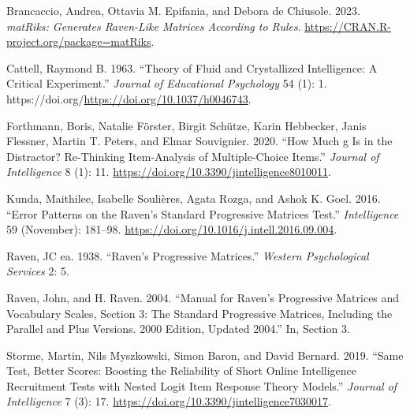 \label{refs}
\begin{CSLReferences}{1}{0}
Brancaccio, Andrea, Ottavia M. Epifania, and Debora de Chiusole. 2023. \emph{matRiks: Generates Raven-Like Matrices According to Rules}. \url{https://CRAN.R-project.org/package=matRiks}.

Cattell, Raymond B. 1963. {``Theory of Fluid and Crystallized Intelligence: A Critical Experiment.''} \emph{Journal of Educational Psychology} 54 (1): 1. https://doi.org/\url{https://doi.org/10.1037/h0046743}.

Forthmann, Boris, Natalie Förster, Birgit Schütze, Karin Hebbecker, Janis Flessner, Martin T. Peters, and Elmar Souvignier. 2020. {``How {Much} g {Is} in the {Distractor}? {Re}-{Thinking} {Item}-{Analysis} of {Multiple}-{Choice} {Items}.''} \emph{Journal of Intelligence} 8 (1): 11. \url{https://doi.org/10.3390/jintelligence8010011}.

Kunda, Maithilee, Isabelle Soulières, Agata Rozga, and Ashok K. Goel. 2016. {``Error Patterns on the {Raven}'s {Standard} {Progressive} {Matrices} {Test}.''} \emph{Intelligence} 59 (November): 181--98. \url{https://doi.org/10.1016/j.intell.2016.09.004}.

Raven, JC ea. 1938. {``Raven's Progressive Matrices.''} \emph{Western Psychological Services} 2: 5.

Raven, John, and H. Raven. 2004. {``Manual for {Raven}'s {Progressive} {Matrices} and {Vocabulary} {Scales}, {Section} 3: {The} {Standard} {Progressive} {Matrices}, {Including} the {Parallel} and {Plus} {Versions}. 2000 {Edition}, Updated 2004.''} In, Section 3.

Storme, Martin, Nils Myszkowski, Simon Baron, and David Bernard. 2019. {``Same {Test}, {Better} {Scores}: {Boosting} the {Reliability} of {Short} {Online} {Intelligence} {Recruitment} {Tests} with {Nested} {Logit} {Item} {Response} {Theory} {Models}.''} \emph{Journal of Intelligence} 7 (3): 17. \url{https://doi.org/10.3390/jintelligence7030017}.

\end{CSLReferences}


\address{%
Quietest Quokka\\
University of Little Mates\\%
Department of Letter Q\\ Somewhere, Australia\\
%
\url{https://www.britannica.com/animal/quokka}\\%
\textit{ORCiD: \href{https://orcid.org/0000-1721-1511-1101}{0000-1721-1511-1101}}\\%
\href{mailto:qquo@ulm.edu}{\nolinkurl{qquo@ulm.edu}}%
}

